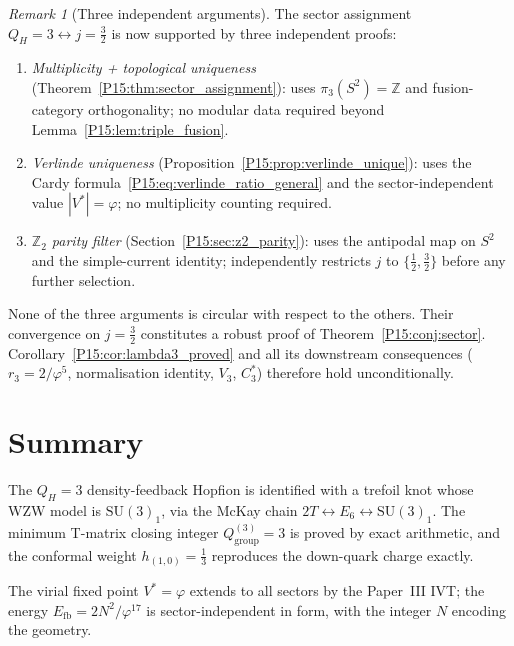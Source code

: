 \documentclass[11pt,a4paper]{article}
\theoremstyle{definition}\newtheorem{definition}[theorem]{Definition}
\theoremstyle{remark}
\newtheorem{remark}[theorem]{Remark}
\newcommand{\vp}{\varphi}
\newcommand{\SU}{\mathrm{SU}}
\newcommand{\Efb}{E_{\mathrm{fb}}}
\newcommand{\twoT}{2T}
\newcommand{\QH}{Q_H}
\begin{document}
\begin{remark}[Three independent arguments]
\label{P15:rem:three_arguments}
The sector assignment $\QH=3\leftrightarrow j=\frac32$
is now supported by three independent proofs:
\begin{enumerate}[noitemsep,label=\textup{(\roman*)}]
\item \emph{Multiplicity + topological uniqueness}
  (Theorem~\ref{P15:thm:sector_assignment}):
  uses $\pi_3(S^2)=\mathbb{Z}$ and fusion-category orthogonality;
  no modular data required beyond Lemma~\ref{P15:lem:triple_fusion}.
\item \emph{Verlinde uniqueness}
  (Proposition~\ref{P15:prop:verlinde_unique}):
  uses the Cardy formula~\eqref{P15:eq:verlinde_ratio_general}
  and the sector-independent value $|V^*|=\vp$;
  no multiplicity counting required.
\item \emph{$\mathbb{Z}_2$ parity filter} (Section~\ref{P15:sec:z2_parity}):
  uses the antipodal map on $S^2$ and the simple-current
  identity; independently restricts $j$ to $\{\frac12,\frac32\}$
  before any further selection.
\end{enumerate}
None of the three arguments is circular with respect to the others.
Their convergence on $j=\frac32$ constitutes a robust proof of
Theorem~\ref{P15:conj:sector}.
Corollary~\ref{P15:cor:lambda3_proved} and all its downstream
consequences ($r_3=2/\vp^5$, normalisation identity, $V_3$, $C_3^*$)
therefore hold unconditionally.
\end{remark}

\section{Summary}
\label{P15:sec:summary}

The $\QH=3$ density-feedback Hopfion is identified with a trefoil
knot whose WZW model is $\SU(3)_1$, via the McKay chain
$\twoT\leftrightarrow E_6\leftrightarrow\SU(3)_1$.
The minimum T-matrix closing integer $Q_{\mathrm{group}}^{(3)}=3$
is proved by exact arithmetic, and the conformal weight
$h_{(1,0)}=\tfrac{1}{3}$ reproduces the down-quark charge exactly.

The virial fixed point $V^*=\vp$ extends to all sectors by the
Paper~III IVT; the energy $\Efb=2N^2/\vp^{17}$ is
sector-independent in form, with the integer $N$ encoding the geometry.
\end{document}
